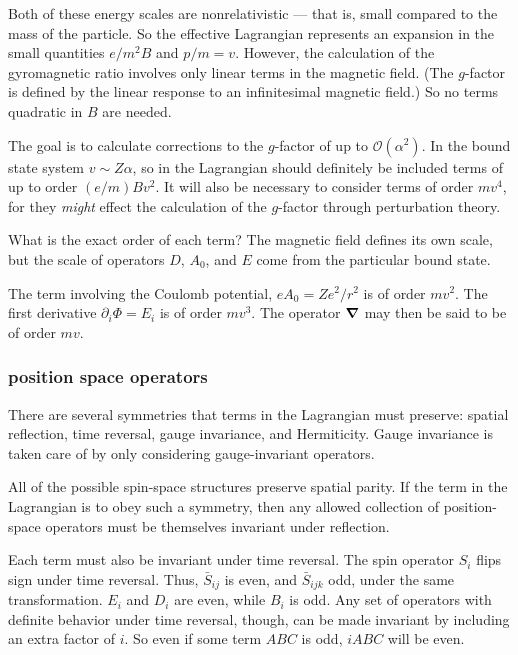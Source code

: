 Both of these energy scales are nonrelativistic --- that is, small compared to the mass of the particle.  So the effective Lagrangian represents an expansion in the small quantities $e/m^2 B$ and $p/m = v$.  However, the calculation of the gyromagnetic ratio involves only linear terms in the magnetic field. (The $g$-factor is defined by the linear response to an infinitesimal magnetic field.)  So no terms quadratic in $B$ are needed.

The goal is to calculate corrections to the $g$-factor of up to $\mathcal{O}(\alpha^2)$.  In the bound state system $v \sim Z\alpha$, so in the Lagrangian should definitely be included terms of up to order $(e/m) B v^2$.  It will also be necessary to consider terms of order $mv^4$, for they {\it might} effect the calculation of the $g$-factor through perturbation theory. 

What is the exact order of each term?  The magnetic field defines its own scale, but the scale of operators $D$, $A_0$, and $E$ come from the particular bound state.

The term involving the Coulomb potential, $e A_0 = Z e^2 / r^2$ is of order $mv^2$.  The first derivative $ \partial_i \Phi =E_i$ is of order $mv^3$.  The operator $\grad$ may then be said to be of order $mv$.

 

\subsubsection{position space operators}

There are several symmetries that terms in the Lagrangian must preserve: spatial reflection, time reversal, gauge invariance, and Hermiticity.  Gauge invariance is taken care of by only considering gauge-invariant operators.

All of the possible spin-space structures preserve spatial parity.  If the term in the Lagrangian is to obey such a symmetry, then any allowed collection of position-space operators must be themselves invariant under reflection.  

Each term must also be invariant under time reversal.  The spin operator $S_i$ flips sign under time reversal.  Thus, $\bar{S}_{ij}$ is even, and $\bar{S}_{ijk}$ odd, under the same transformation.  $E_i$ and $D_i$ are even, while $B_i$ is odd.  Any set of operators with definite behavior under time reversal, though, can be made invariant by including an extra factor of $i$.  So even if some term $ABC$ is odd, $iABC$ will be even.

